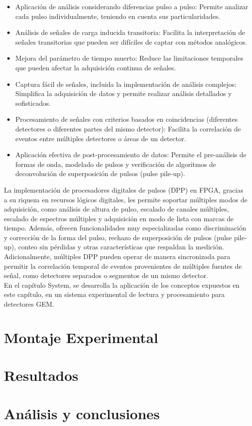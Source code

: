 \documentclass[]{book}
\begin{document}
\begin{itemize}
    \item Aplicación de análisis considerando diferencias pulso a pulso: Permite analizar cada pulso individualmente, teniendo en cuenta sus particularidades.
    \item Análisis de señales de carga inducida transitoria: Facilita la interpretación de señales transitorias que pueden ser difíciles de captar con métodos analógicos.
    \item  Mejora del parámetro de tiempo muerto: Reduce las limitaciones temporales que pueden afectar la adquisición continua de señales.
    \item Captura fácil de señales, incluida la implementación de análisis complejos: Simplifica la adquisición de datos y permite realizar análisis detallados y sofisticados.
    \item Procesamiento de señales con criterios basados en coincidencias (diferentes detectores o diferentes partes del mismo detector): Facilita la correlación de eventos entre múltiples detectores o áreas de un detector.
    \item Aplicación efectiva de post-procesamiento de datos: Permite el pre-análisis de formas de onda, modelado de pulsos y verificación de algoritmos de deconvolución de superposición de pulsos (pulse pile-up).

\end{itemize}

\noindent La implementación de procesadores digitales de pulsos (DPP) en FPGA, gracias a su riqueza en recursos lógicos digitales, les permite soportar múltiples modos de adquisición, como análisis de altura de pulso, escalado de canales múltiples, escalado de espectros múltiples y adquisición en modo de lista con marcas de tiempo. Además, ofrecen funcionalidades muy especializadas como discriminación y corrección de la forma del pulso, rechazo de superposición de pulsos (pulse pile-up), conteo sin pérdidas y otras características que respaldan la medición. Adicionalmente, múltiples DPP pueden operar de manera sincronizada para permitir la correlación temporal de eventos provenientes de múltiples fuentes de señal, como detectores separados o segmentos de un mismo detector. \\

\noindent En el capítulo System, se desarrolla la aplicación de los conceptos expuestos en este capítulo, en un sistema experimental de lectura y procesamiento para detectores GEM.

\section{Montaje Experimental}
\section{Resultados}
\section{Análisis y conclusiones}





\end{document}
